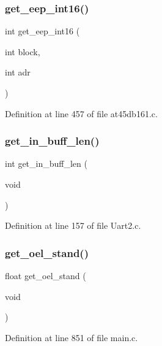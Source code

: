 \subsubsection{get\+\_\+eep\+\_\+int16()}
{\footnotesize\ttfamily int get\+\_\+eep\+\_\+int16 (\begin{DoxyParamCaption}\item[{int}]{block,  }\item[{int}]{adr }\end{DoxyParamCaption})}



Definition at line 457 of file at45db161.\+c.

\mbox{\label{befehl_8c_a4c3e6263e6d1bb276097e6d204ca10d6}} 
\subsubsection{get\+\_\+in\+\_\+buff\+\_\+len()}
{\footnotesize\ttfamily int get\+\_\+in\+\_\+buff\+\_\+len (\begin{DoxyParamCaption}\item[{void}]{ }\end{DoxyParamCaption})}



Definition at line 157 of file Uart2.\+c.

\mbox{\label{befehl_8c_a0ed37e617173ebc136c88d1301a9ecbd}} 
\subsubsection{get\+\_\+oel\+\_\+stand()}
{\footnotesize\ttfamily float get\+\_\+oel\+\_\+stand (\begin{DoxyParamCaption}\item[{void}]{ }\end{DoxyParamCaption})}



Definition at line 851 of file main.\+c.

\mbox{\label{befehl_8c_a2a01319ebcf38fe7cd43bddc34348e10}} 
